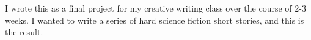 \documentclass[main.tex]{subfiles}
\begin{document}
	I wrote this as a final project for my creative writing class over the course of 2-3 weeks.
	I wanted to write a series of hard science fiction short stories, and this is the result.
	   
\end{document}
